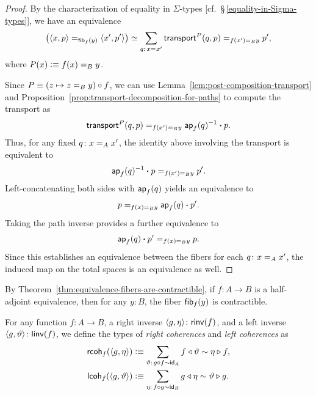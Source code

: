 \begin{proof}
    By the characterization of equality in $\Sigma$-types [cf.~\S\,\ref{equality-in-Sigma-types}], we have an equivalence
    \[
        \bigl(\dep{x,p}\eq{\fun{fib}_f(y)}\dep{x',p'}\bigr)
        \simeq
        \sum_{q\colon x\eq{}x'} \fun{transport}^P(q,p)\eq{f(x')\eq By}p',
    \]
    where $P(x)\mathrel{\vcentcolon}\equiv f(x)\mathrel{=_{B}}y$.

    Since $P\equiv(z\mapsto z\mathrel{=_{B}}y)\circ f$, we can use Lemma~\ref{lem:post-composition-transport} and Proposition~\ref{prop:transport-decomposition-for-paths} to compute the transport as
    \[
        \mathsf{transport}^P(q,p)
        \mathrel{=_{f(x')\mathrel{=_{B}}y}}
        \mathsf{ap}_f(q)^{-1}\mathbin{\boldsymbol{\cdot}} p.
    \]
    Thus, for any fixed $q\colon x\eq Ax'$, the identity above involving the transport is equivalent to
    \[
        \mathsf{ap}_f(q)^{-1}\mathbin{\boldsymbol{\cdot}} p\mathrel{=_{f(x')\mathrel{=_{B}}y}}p'.
    \]
    Left-concatenating both sides with $\mathsf{ap}_f(q)$ yields an equivalence to
    \[
        p\mathrel{=_{f(x)\mathrel{=_{B}}y}}\mathsf{ap}_f(q)\mathbin{\boldsymbol{\cdot}} p'.
    \]
    Taking the path inverse provides a further equivalence to
    \[
        \mathsf{ap}_f(q)\mathbin{\boldsymbol{\cdot}} p'\mathrel{=_{f(x)\mathrel{=_{B}}y}}p.
    \]
    Since this establishes an equivalence between the fibers for each $q\colon x\eq Ax'$, the induced map on the total spaces is an equivalence as well.
\end{proof}

\begin{rem}\label{rem:equivalence-fib-is-contractible}
    By Theorem~\ref{thm:equivalence-fibers-are-contractible}, if $f\colon A\to B$ is a half-adjoint equivalence, then for any $y\colon B$, the fiber $\mathsf{fib}_f(y)$ is contractible.
\end{rem}

\begin{defn}\label{def:coherences}
    For any function\/ $f\colon A\to B$, a right inverse\/ $\dep{g,\eta}\colon\fun{rinv}(f)$, and a left inverse\/ $\dep{g,\vartheta}\colon\fun{linv}(f)$, we define the types of \textsl{right coherences} and \textsl{left coherences} as
    \begin{align*}
        \fun{rcoh}_f(\dep{g,\eta})
            &\defeq \sum_{\vartheta\colon g\circ f\sim\id_A} f\lwct\vartheta\sim\eta\rwct f,\\
        \fun{lcoh}_f(\dep{g,\vartheta})
            &\defeq \sum_{\eta\colon f\circ g\sim\id_B} g\lwct\eta\sim\vartheta\rwct g.
    \end{align*}
\end{defn}

